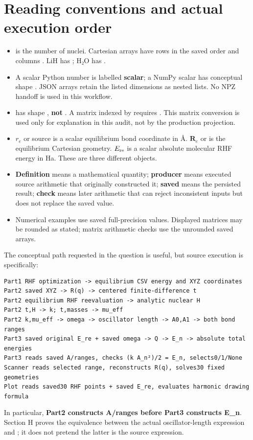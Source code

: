 \documentclass[10pt,a4paper]{article}
\begin{document}
\section{Reading conventions and actual execution order}
\begin{itemize}
\item {} is the number of nuclei. Cartesian arrays have rows in the saved  order and columns . LiH has ; H₂O has .
\item A scalar Python number is labelled \textbf{scalar}; a NumPy scalar has conceptual shape \code{()}. JSON arrays retain the listed dimensions as nested lists. No NPZ handoff is used in this workflow.
\item {} has shape , \textbf{not} . A matrix indexed by  requires . This matrix conversion is used only for explanation in this audit, not by the production projection.
\item \(r_e\) or source  is a scalar equilibrium bond coordinate in Å. \(\mathbf R_e\) or  is the  equilibrium Cartesian geometry. \(E_{\rm re}\) is a scalar absolute molecular RHF energy in Ha. These are three different objects.
\item \textbf{Definition} means a mathematical quantity; \textbf{producer} means executed source arithmetic that originally constructed it; \textbf{saved} means the persisted result; \textbf{check} means later arithmetic that can reject inconsistent inputs but does not replace the saved value.
\item Numerical examples use saved full-precision values. Displayed matrices may be rounded as stated; matrix arithmetic checks use the unrounded saved arrays.
\end{itemize}
The conceptual path requested in the question is useful, but source execution is specifically:

\begin{Verbatim}
Part1 RHF optimization -> equilibrium CSV energy and XYZ coordinates
Part2 saved XYZ -> R(q) -> centered finite-difference t
Part2 equilibrium RHF reevaluation -> analytic nuclear H
Part2 t,H -> k; t,masses -> mu_eff
Part2 k,mu_eff -> omega -> oscillator length -> A0,A1 -> both bond ranges
Part3 saved original E_re + saved omega -> Q -> E_n -> absolute total energies
Part3 reads saved A/ranges, checks (k A_n²)/2 = E_n, selects0/1/None
Scanner reads selected range, reconstructs R(q), solves30 fixed geometries
Plot reads saved30 RHF points + saved E_re, evaluates harmonic drawing formula
\end{Verbatim}
In particular, \textbf{Part2 constructs A/ranges before Part3 constructs E\_n}. Section H proves the equivalence between the actual oscillator-length expression and ; it does not pretend the latter is the source expression.
\end{document}
